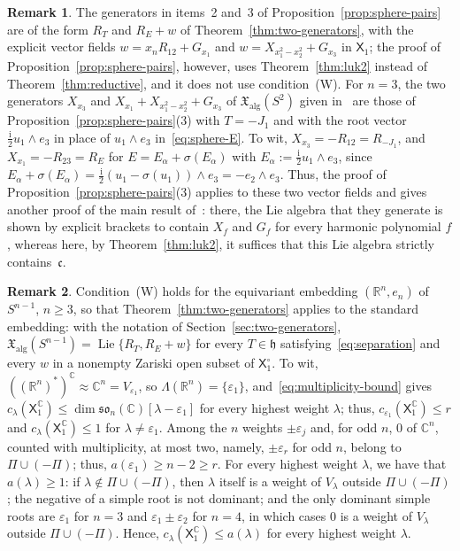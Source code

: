 \documentclass{article}
\newcommand{\R}{\mathbb{R}}
\newcommand{\C}{\mathbb{C}}
\newcommand{\frakh}{\mathfrak{h}}
\newcommand{\frakc}{\mathfrak{c}}
\newcommand{\xalg}{\mathfrak X_{\mathrm{alg}}}
\newcommand{\sX}{\mathsf{X}}
\theoremstyle{definition}
\newtheorem{remark}{Remark}
\theoremstyle{plain}
\begin{document}
\begin{remark}\label{rem:sphere-form}
The generators in items~2 and~3 of Proposition~\ref{prop:sphere-pairs} are of the form $R_T$ and $R_E+w$ of Theorem~\ref{thm:two-generators}, with the explicit vector fields $w=x_nR_{12}+G_{x_1}$ and $w=X_{x_1^2-x_2^2}+G_{x_3}$ in $\sX_1$; the proof of Proposition~\ref{prop:sphere-pairs}, however, uses Theorem~\ref{thm:luk2} instead of Theorem~\ref{thm:reductive}, and it does not use condition~(W).
For $n=3$, the two generators $X_{x_3}$ and $X_{x_1}+X_{x_1^2-x_2^2}+G_{x_3}$ of $\xalg(S^2)$ given in~\cite{CofDS2} are those of Proposition~\ref{prop:sphere-pairs}(3) with $T=-J_1$ and with the root vector $\frac{\mathrm{i}}{2}u_1\wedge e_3$ in place of $u_1\wedge e_3$ in~\eqref{eq:sphere-E}.
To wit, $X_{x_3}=-R_{12}=R_{-J_1}$, and $X_{x_1}=-R_{23}=R_E$ for $E=E_\alpha+\sigma(E_\alpha)$ with $E_\alpha:=\frac{\mathrm{i}}{2}u_1\wedge e_3$, since $E_\alpha+\sigma(E_\alpha)=\frac{\mathrm{i}}{2}(u_1-\sigma(u_1))\wedge e_3=-e_2\wedge e_3$.
Thus, the proof of Proposition~\ref{prop:sphere-pairs}(3) applies to these two vector fields and gives another proof of the main result of~\cite{CofDS2}: there, the Lie algebra that they generate is shown by explicit brackets to contain $X_f$ and $G_f$ for every harmonic polynomial $f$, whereas here, by Theorem~\ref{thm:luk2}, it suffices that this Lie algebra strictly contains~$\frakc$.
\end{remark}

\begin{remark}\label{rem:W-sphere}
Condition~(W) holds for the equivariant embedding $(\R^n,e_n)$ of $S^{n-1}$, $n\geq3$, so that Theorem~\ref{thm:two-generators} applies to the standard embedding: with the notation of Section~\ref{sec:two-generators}, $\xalg(S^{n-1})=\operatorname{Lie}\{R_T,R_E+w\}$ for every $T\in\frakh$ satisfying~\eqref{eq:separation} and every $w$ in a nonempty Zariski open subset of $\sX_1^\circ$.
To wit, $((\R^n)^*)^\C\approx\C^n=V_{\varepsilon_1}$, so $\Lambda(\R^n)=\{\varepsilon_1\}$, and~\eqref{eq:multiplicity-bound} gives $c_\lambda(\sX_1^\C)\leq\dim\mathfrak{so}_n(\C)[\lambda-\varepsilon_1]$ for every highest weight $\lambda$; thus,
    $c_{\varepsilon_1}(\sX_1^\C)\leq r$ and $c_\lambda(\sX_1^\C)\leq1$ for $\lambda\neq\varepsilon_1$.
Among the $n$ weights $\pm\varepsilon_j$ and, for odd $n$, $0$ of $\C^n$, counted with multiplicity, at most two, namely, $\pm\varepsilon_r$ for odd $n$, belong to $\Pi\cup(-\Pi)$; thus, $a(\varepsilon_1)\geq n-2\geq r$.
For every highest weight $\lambda$, we have that $a(\lambda)\geq1$: if $\lambda\notin\Pi\cup(-\Pi)$, then $\lambda$ itself is a weight of $V_\lambda$ outside $\Pi\cup(-\Pi)$; the negative of a simple root is not dominant; and the only dominant simple roots are $\varepsilon_1$ for $n=3$ and $\varepsilon_1\pm\varepsilon_2$ for $n=4$, in which cases $0$ is a weight of $V_\lambda$ outside $\Pi\cup(-\Pi)$.
Hence, $c_\lambda(\sX_1^\C)\leq a(\lambda)$ for every highest weight $\lambda$.
\end{remark}
\end{document}
